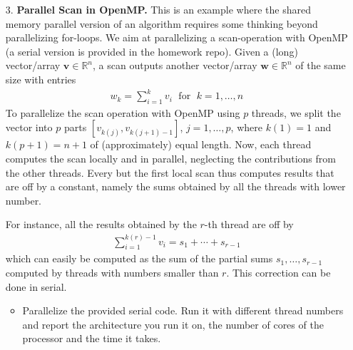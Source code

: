 \documentclass[10pt]{article}
\newcommand{\R}{\mathbb{R}}
\newcommand{\vb}[1]{\mathbf{#1}}
\begin{document}
\begin{enumerate}
We note that as $N$ increases the relative speed to the built-in function decreases. Growing the problem size by 3 orders of magnitude from $N=$ 1e+04 to $N=$ 1e+07 causes causes the Taylor method to go from 2.78x faster to 2.39x faster. Likewise, the SSE instrisic method goes from 5.46x faster to 3.77xx faster and the method using the Vec class goes from 10.8x faster to 4.69x faster.

One peculiar feature is that while the relative speed to built-in decreases as $N$ grows, we do see a small increase from $N=$ 1e+07 to $N=$ 5e+07 for all three methods. While the jump is small, it's near a near 10\% increase for the vectorized methods. One possible explanation for this increase in relative speed is that our processor has "Turbo Boost" which allows it to run faster when necessary, but this is controlled at the machine level. As a result we cannot manually enable or even detect when exactly this improved clock rate is active. \qed







\item[3.] \textbf{Parallel Scan in OpenMP.} This is an example where the shared memory parallel version of an algorithm requires some thinking beyond parallelizing for-loops. We aim at parallelizing a scan-operation with OpenMP (a serial version is provided in the homework repo). Given a (long) vector/array $\vb v \in \R^{n}$, a scan outputs another vector/array $\vb w \in \R^{n}$ of the same size with entries
\begin{align*}
w_{k} = \sum_{i=1}^{k} v_{i} \; \text{  for  } \; k=1,\dotsc,n
\end{align*}
To parallelize the scan operation with OpenMP using $p$ threads, we split the vector into $p$ parts $[v_{k(j)}, v_{k(j+1)-1}]$, $j=1,\dotsc,p$, where $k(1) = 1$ and $k(p+1) = n+1$ of (approximately) equal length. Now, each thread computes the scan locally and in parallel, neglecting the contributions from the other threads. Every but the first local scan thus computes results that are off by a constant, namely the sums obtained by all the threads with lower number.

 For instance, all the results obtained by the $r$-th thread are off by
\begin{align*}
\sum_{i=1}^{k(r)-1} v_{i} = s_{1} + \cdots + s_{r-1}
\end{align*}
which can easily be computed as the sum of the partial sums $s_{1}, \dotsc, s_{r-1}$ computed by threads with numbers smaller than $r$. This correction can be done in serial.
\begin{itemize}
	\item Parallelize the provided serial code. Run it with different thread numbers and report the architecture you run it on, the number of cores of the processor and the time it takes.
\end{itemize}


\end{enumerate}
\end{document}
